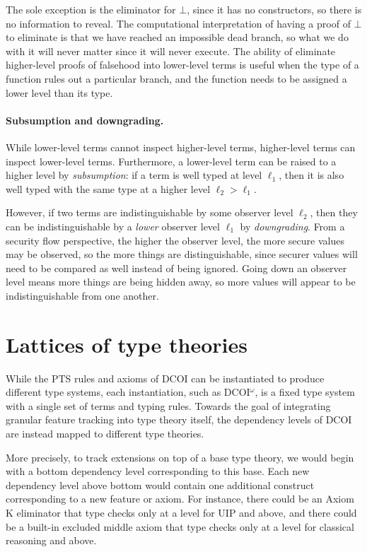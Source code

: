 \documentclass{article}
\begin{document}
The sole exception is the eliminator for $\bot$,
since it has no constructors, so there is no information to reveal.
The computational interpretation of having a proof of $\bot$ to eliminate
is that we have reached an impossible dead branch,
so what we do with it will never matter since it will never execute.
The ability of eliminate higher-level proofs of falsehood into lower-level terms
is useful when the type of a function rules out a particular branch,
and the function needs to be assigned a lower level than its type.

\paragraph{Subsumption and downgrading.}
While lower-level terms cannot inspect higher-level terms,
higher-level terms can inspect lower-level terms.
Furthermore, a lower-level term can be raised to a higher level by \emph{subsumption}:
if a term is well typed at level $\ell_1$,
then it is also well typed with the same type at a higher level $\ell_2 > \ell_1$.

However, if two terms are indistinguishable by some observer level $\ell_2$,
then they can be indistinguishable by a \emph{lower} observer level $\ell_1$ by \emph{downgrading}.
From a security flow perspective, the higher the observer level,
the more secure values may be observed,
so the more things are distinguishable,
since securer values will need to be compared as well instead of being ignored.
Going down an observer level means more things are being hidden away,
so more values will appear to be indistinguishable from one another.

\section{Lattices of type theories} \label{sec:lattice}

While the PTS rules and axioms of DCOI can be instantiated to produce different type systems,
each instantiation, such as DCOI$^\omega$,
is a fixed type system with a single set of terms and typing rules.
Towards the goal of integrating granular feature tracking into type theory itself,
the dependency levels of DCOI are instead mapped to different type theories.

More precisely, to track extensions on top of a base type theory,
we would begin with a bottom dependency level corresponding to this base.
Each new dependency level above bottom would contain one additional construct
corresponding to a new feature or axiom.
For instance, there could be an Axiom K eliminator that type checks
only at a level for UIP and above,
and there could be a built-in excluded middle axiom that type checks
only at a level for classical reasoning and above.
\end{document}
